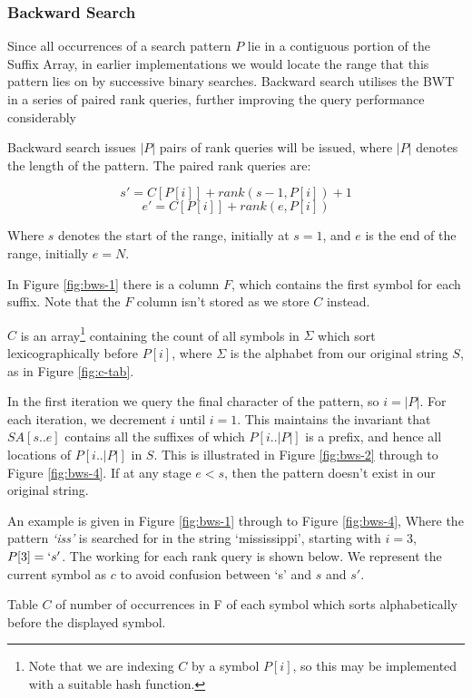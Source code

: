 \subsubsection{Backward Search}
Since all occurrences of a search pattern $P$ lie in a contiguous portion of the 
Suffix Array, in earlier implementations we would locate the range that this 
pattern lies on by successive binary searches. Backward search utilises the BWT 
in a series of paired rank queries, further improving the query performance 
considerably ~\cite{claude2008, ferragina2009, ferragina2007, golynski2006, makinen2007b,
makinen2007a, marin2003, navarro2006}

Backward search issues $|P|$ pairs of rank queries will be issued, where $|P|$ 
denotes the length of the pattern. The paired rank queries are:

					$$ s' = C[P[i]] + rank(s - 1, P[i]) + 1$$
					$$ e' = C[P[i]] + rank(e, P[i])$$

Where $s$ denotes the start of the range, initially at $s = 1$, and $e$ is the 
end of the range, initially $e = N$.

In Figure \ref{fig:bws-1} there is a column $F$, which contains the first 
symbol for each suffix. Note that the $F$ column isn't stored as we store 
$C$ instead.

$C$ is an array\footnote{Note that we are indexing $C$ by a symbol $P[i]$, so 
this may be implemented with a suitable hash function.} containing the count of 
all symbols in $\Sigma$ which sort lexicographically before $P[i]$, where 
$\Sigma$ is the alphabet from our original string $S$, as in Figure 
\ref{fig:c-tab}.

In the first iteration 
we query the final character of the pattern, so $i = |P|$.  For each 
iteration, we decrement $i$ until $i = 1$. This maintains the invariant that
$SA[s..e]$ contains all the suffixes of which $P[i..|P|]$ is a prefix, and hence
all locations of $P[i..|P|]$ in $S$. This is illustrated in Figure 
\ref{fig:bws-2} through to Figure \ref{fig:bws-4}. If at any stage $e < 
s$, then the pattern doesn't exist in our original string.

An example is given in Figure \ref{fig:bws-1} through to Figure \ref{fig:bws-4},
Where the pattern \emph{`iss'} is searched for in the string `mississippi',
starting with $i = 3$, $P[3] = `s'$. The working for each rank query is shown 
below. We represent the current symbol as $c$ to avoid confusion between `s' and 
$s$ and $s'$.


			{Table $C$ of number of occurrences in F of each symbol which
			sorts alphabetically before the displayed symbol.}

